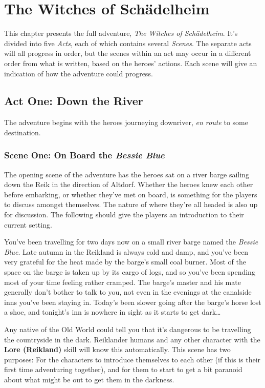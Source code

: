 \chapter{The Witches of Sch{\"a}delheim}\label{ch:adventure}

This chapter presents the full adventure, \textit{The Witches of
Sch{\"a}delheim}. It's divided into five \textit{Acts}, each of which contains
several \textit{Scenes}. The separate acts will all progress in order, but
the scenes within an act may occur in a different order from what is written,
based on the heroes' actions. Each scene will give an indication of how the
adventure could progress.


\section{Act One: Down the River}
The adventure begins with the heroes journeying downriver, \textit{en route} to
some destination.

\subsection{Scene One: On Board the \textit{Bessie Blue}}
The opening scene of the adventure has the heroes sat on a river barge sailing
down the Reik in the direction of Altdorf. Whether the heroes knew each other
before embarking, or whether they've met on board, is something for the players
to discuss amongst themselves. The nature of where they're all headed is also
up for discussion. The following should give the players an introduction to
their current setting.

\begin{callout}
You've been travelling for two days now on a small river barge named the
\textit{Bessie Blue}. Late autumn in the Reikland is always cold and damp, and
you've been very grateful for the heat made by the barge's small coal burner.
Most of the space on the barge is taken up by its cargo of logs, and so you've
been spending most of your time feeling rather cramped. The barge's master and
his mate generally don't bother to talk to you, not even in the evenings at the
canalside inns you've been staying in. Today's been slower going after the
barge's horse lost a shoe, and tonight's inn is nowhere in sight as it starts
to get dark\ldots{}
\end{callout}

Any native of the Old World could tell you that it's dangerous to be travelling
the countryside in the dark. Reiklander humans and any other character with the
\textbf{Lore (Reikland)} skill will know this automatically. This scene has
two purposes: For the characters to introduce themselves to each other (if this
is their first time adventuring together), and for them to start to get a bit
paranoid about what might be out to get them in the darkness.
